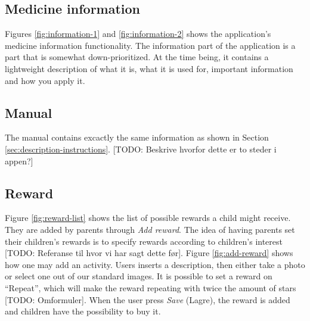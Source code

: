 \subsection{Medicine information}
\label{sec:description-medicine-information}
Figures \ref{fig:information-1} and \ref{fig:information-2} shows the application's medicine information functionality. The information part of the application is a part that is somewhat down-prioritized. At the time being, it contains a lightweight description of what it is, what it is used for, important information and how you apply it. 


\subsection{Manual}
\label{sec:description-manual}
The manual contains excactly the same information as shown in Section \ref{sec:description-instructions}. [TODO: Beskrive hvorfor dette er to steder i appen?]


\subsection{Reward}
\label{sec:description-manage-rewards}
Figure \ref{fig:reward-list} shows the list of possible rewards a child might receive. They are added by parents through \emph{Add reward}. The idea of having parents set their children's rewards is to specify rewards according to children's interest [TODO: Referanse til hvor vi har sagt dette før]. Figure \ref{fig:add-reward} shows how one may add an activity. Users inserts a description, then either take a photo or select one out of our standard images. It is possible to set a reward on ``Repeat'', which will make the reward repeating with twice the amount of stars [TODO: Omformuler].        
When the user press \emph{Save} (Lagre), the reward is added and children have the possibility to buy it. 
 
